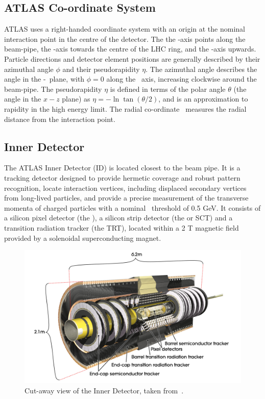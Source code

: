 \subsection{ATLAS Co-ordinate System}
ATLAS uses a right-handed coordinate system with an origin at the nominal
interaction point in the centre of the detector. The 
the \z-axis points along the beam-pipe, the \x-axis towards the 
centre of the LHC ring, and the \y-axis upwards. Particle directions and
detector element positions are generally described by their azimuthal angle
$\phi$ and their pseudorapidity $\eta$. The azimuthal angle describes the angle
in the \x-\y\ plane, with $\phi=0$ along the \x\ axis, increasing clockwise
around the beam-pipe.
The pseudorapidity $\eta$ is defined in terms of the polar angle $\theta$ (the
angle in the $x-z$ plane) as $\eta = - \ln\tan(\theta/2)$, and is an
approximation to rapidity in the high energy limit.
The radial co-ordinate \R\ measures the radial distance from the interaction
point. 

\subsection{Inner Detector}

The ATLAS Inner Detector (ID) is located closest to the beam pipe. It is a tracking
detector designed to provide hermetic coverage and robust pattern recognition, locate
interaction vertices, including displaced secondary vertices from long-lived
particles, and provide a precise measurement of the transverse momenta of charged
particles with a nominal \pt\ threshold of 0.5 GeV. It consists
of a silicon pixel detector (the ), a silicon strip
detector (the  or SCT) and a transition radiation tracker (the TRT), located within a
2 T magnetic field provided by a solenoidal superconducting magnet.

\begin{figure}[h]
\centering
\includegraphics[width=\textwidth]{ID_newTRT_d3}
\caption{Cut-away view of the Inner Detector, taken from~\cite{Aad:1125884}.}
\label{fig:id-1}
\end{figure}

